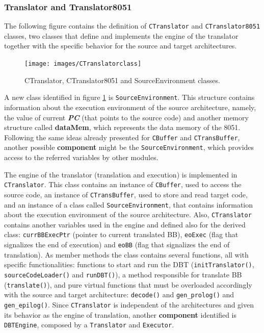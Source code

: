\documentclass[12pt]{article}
\begin{document}
{\subsubsection*{Translator and Translator8051}

The following figure contains the definition of \texttt{CTranslator} and \texttt{CTranslator8051} classes, two classes that define and implements the engine of the translator together with the specific behavior for the source and target architectures. 

\begin{figure}[!htb]
\centerline{
\texttt{[image: images/CTranslatorclass]}}
\caption{CTranslator, CTranslator8051 and SourceEnvironment classes.}
\label{fig:translatorclass} 
\end{figure}


A new class identified in figure \ref{fig:translatorclass} is \texttt{SourceEnvironment}. This structure contains information about the execution environment of the source architecture, namely, the value of current \textbf{\textit{PC}} (that points to the source code) and another memory structure called \textbf{dataMem}, which represents the data memory of the 8051. Following the same ideas already presented for \texttt{CBuffer} and \texttt{CTransBuffer}, another possible \textbf{component} might be the \texttt{SourceEnvironment}, which provides access to the referred variables by other modules. 

The engine of the translator (translation and execution) is implemented in \texttt{CTranslator}. This class contains an instance of \texttt{CBuffer}, used to access the source code, an instance of \texttt{CTransBuffer}, used to store and read target code, and an instance of a class called \texttt{SourceEnvironment}, that contains information about the execution environment of the source architecture. Also, \texttt{CTranslator} contains another variables used in the engine and defined also for the derived class: \texttt{currBBExecPtr} (pointer to current translated BB), \texttt{eoExec} (flag that signalizes the end of execution) and \texttt{eoBB} (flag that signalizes the end of translation). As member methods the class contains several functions, all with specific functionalities: functions to start and run the DBT (\texttt{initTranslator()}, \texttt{sourceCodeLoader()} and \texttt{runDBT()}), a method responsible for translate BB (\texttt{translate()}), and pure virtual functions that must be overloaded accordingly with the source and target architecture: \texttt{decode()} and \texttt{gen\_prolog()} and \texttt{gen\_epilog()}. Since \texttt{CTranslator} is independent of the architectures and given its behavior as the engine of translation, another \textbf{component} identified is \texttt{DBTEngine}, composed by a \texttt{Translator} and \texttt{Executor}. 

}
\end{document}
